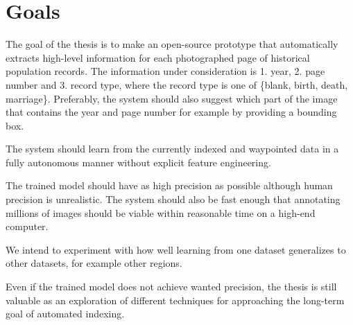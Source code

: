 \section{Goals}


The goal of the thesis is to make an open-source prototype that automatically extracts high-level information for each photographed page of historical population records. The information under consideration is 1. year, 2. page number and 3. record type, where the record type is one of \{blank, birth, death, marriage\}. Preferably, the system should also suggest which part of the image that contains the year and page number for example by providing a bounding box.

The system should learn from the currently indexed and waypointed data in a fully autonomous manner without explicit feature engineering.

The trained model should have as high precision as possible although human precision is unrealistic. The system should also be fast enough that annotating millions of images should be viable within reasonable time on a high-end computer.


We intend to experiment with how well learning from one dataset generalizes to other datasets, for example other regions.

Even if the trained model does not achieve wanted precision, the thesis is still valuable as an exploration of different techniques for approaching the long-term goal of automated indexing.
